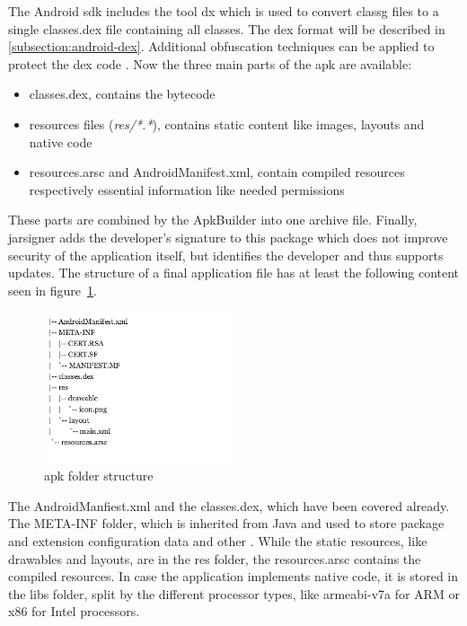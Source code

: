 The Android \gls{sdk} includes the tool dx which is used to convert \gls{classg} files to a single classes.dex file containing all classes.
The \gls{dex} format will be described in \ref{subsection:android-dex}.
Additional obfuscation techniques can be applied to protect the \gls{dex} code \cite{dexProtector}.
\newline
Now the three main parts of the \gls{apk} are available:
\begin{itemize}
\item classes.dex, contains the bytecode
\item resources files (\textit{res/*.*}), contains static content like images, layouts and native code
\item resources.arsc and AndroidManifest.xml, contain compiled resources respectively essential information like needed permissions
\end{itemize}
These parts are combined by the ApkBuilder into one archive file.
\newline
Finally, jarsigner adds the developer’s signature to this package which does not improve security of the application itself, but identifies the developer and thus supports updates.
\newline
\newline
The structure of a final application file has at least the following content seen in figure~\ref{fig:apkfolder}.
\begin{figure}[h]
    \centering
    \includegraphics[width=0.5\textwidth]{data/apkfolder.png}
    \caption{\gls{apk} folder structure}
    \label{fig:apkfolder}
\end{figure}
The AndroidManfiest.xml and the classes.dex, which have been covered already.
The META-INF folder, which is inherited from Java and used to store package and extension configuration data and other \cite{metaJava}.
While the static resources, like drawables and layouts, are in the res folder, the resources.arsc contains the compiled resources.
In case the application implements native code, it is stored in the libs folder, split by the different processor types, like armeabi-v7a for ARM or x86 for Intel processors. \cite{kovachevaMaster} \cite{ehringerDalvik}
